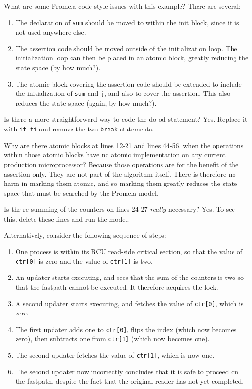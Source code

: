\QuickQ{}
	What are some Promela code-style issues with this example?
\QuickA{}
	There are several:
	\begin{enumerate}
	\item	The declaration of {\tt sum} should be moved to within
		the init block, since it is not used anywhere else.
	\item	The assertion code should be moved outside of the
		initialization loop.  The initialization loop can
		then be placed in an atomic block, greatly reducing
		the state space (by how much?).
	\item	The atomic block covering the assertion code should
		be extended to include the initialization of {\tt sum}
		and {\tt j}, and also to cover the assertion.
		This also reduces the state space (again, by how
		much?).
	\end{enumerate}

\QuickQ{}
	Is there a more straightforward way to code the do-od statement?
\QuickA{}
	Yes.
	Replace it with {\tt if-fi} and remove the two {\tt break} statements.

\QuickQ{}
	Why are there atomic blocks at lines 12-21
	and lines 44-56, when the operations within those atomic
	blocks have no atomic implementation on any current
	production microprocessor?
\QuickA{}
	Because those operations are for the benefit of the
	assertion only.  They are not part of the algorithm itself.
	There is therefore no harm in marking them atomic, and
	so marking them greatly reduces the state space that must
	be searched by the Promela model.

\QuickQ{}
	Is the re-summing of the counters on lines 24-27
	\emph{really} necessary?
\QuickA{}
	Yes.  To see this, delete these lines and run the model.

	Alternatively, consider the following sequence of steps:

	\begin{enumerate}
	\item	One process is within its RCU read-side critical
		section, so that the value of {\tt ctr[0]} is zero and
		the value of {\tt ctr[1]} is two.
	\item	An updater starts executing, and sees that the sum of
		the counters is two so that the fastpath cannot be
		executed.  It therefore acquires the lock.
	\item	A second updater starts executing, and fetches the value
		of {\tt ctr[0]}, which is zero.
	\item	The first updater adds one to {\tt ctr[0]}, flips
		the index (which now becomes zero), then subtracts
		one from {\tt ctr[1]} (which now becomes one).
	\item	The second updater fetches the value of {\tt ctr[1]},
		which is now one.
	\item	The second updater now incorrectly concludes that it
		is safe to proceed on the fastpath, despite the fact
		that the original reader has not yet completed.
	\end{enumerate}

